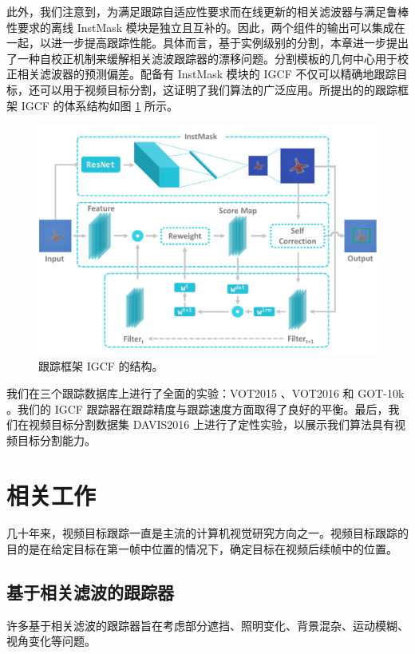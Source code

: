 此外，我们注意到，为满足跟踪自适应性要求而在线更新的相关滤波器与满足鲁棒性要求的离线 InstMask 模块是独立且互补的。因此，两个组件的输出可以集成在一起，以进一步提高跟踪性能。具体而言，基于实例级别的分割，本章进一步提出了一种自校正机制来缓解相关滤波跟踪器的漂移问题。分割模板的几何中心用于校正相关滤波器的预测偏差。配备有 InstMask 模块的 IGCF 不仅可以精确地跟踪目标，还可以用于视频目标分割，这证明了我们算法的广泛应用。所提出的的跟踪框架 IGCF 的体系结构如图 \ref{fig:IGCF} 所示。

\begin{figure}
    \centering
    \includegraphics[width=1.0\textwidth]{Img/IGCF/instmask1.pdf}
    \caption{跟踪框架 IGCF 的结构。}
    \label{fig:IGCF}
\end{figure}

我们在三个跟踪数据库上进行了全面的实验：VOT2015 \cite{Kristan2015TheVO}、VOT2016 \cite{Kristan2016TheVO} 和 GOT-10k \cite{GOT-10k}。我们的 IGCF 跟踪器在跟踪精度与跟踪速度方面取得了良好的平衡。最后，我们在视频目标分割数据集 DAVIS2016 \cite{Perazzi2016} 上进行了定性实验，以展示我们算法具有视频目标分割能力。

\section{相关工作}
几十年来，视频目标跟踪一直是主流的计算机视觉研究方向之一。视频目标跟踪的目的是在给定目标在第一帧中位置的情况下，确定目标在视频后续帧中的位置。

\subsection{基于相关滤波的跟踪器}
许多基于相关滤波的跟踪器旨在考虑部分遮挡、照明变化、背景混杂、运动模糊、视角变化等问题。

